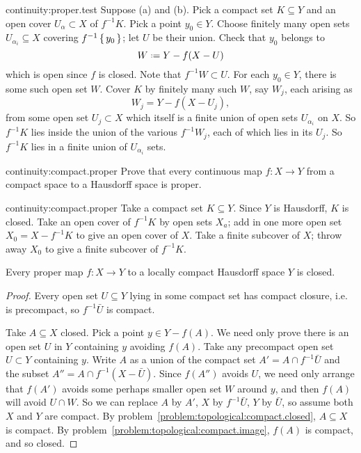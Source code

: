 \begin{answer}{continuity:proper.test}
Suppose (a) and (b).
Pick a compact set \(K\subseteq Y\) and an open cover \(U_{\alpha}\subset X\) of \(f^{-1}K\).
Pick a point \(y_0\in Y\).
Choose finitely many open sets \(U_{\alpha_i}\subseteq X\) covering \(f^{-1}\set{y_0}\); let \(U\) be their union.
Check that \(y_0\) belongs to
\[
W\defeq Y-f(X-U)
\]
which is open since \(f\) is closed.
Note that \(f^{-1}W\subset U\).
For each \(y_0\in Y\), there is some such open set \(W\).
Cover \(K\) by finitely many such \(W\), say \(W_j\), each arising as
\[
W_j=Y-f(X-U_j),
\]
from some open set \(U_j\subset X\) which itself is a finite union of open sets \(U_{\alpha_i}\) on \(X\).
So \(f^{-1}K\) lies inside the union of the various \(f^{-1}W_j\), each of which lies in its \(U_j\).
So \(f^{-1}K\) lies in a finite union of \(U_{\alpha_i}\) sets.
\end{answer}
\begin{problem}{continuity:compact.proper}
Prove that every continuous map \(f\colon X\to Y\) from a compact space to a Hausdorff space is proper.
\end{problem}
\begin{answer}{continuity:compact.proper}
Take a compact set \(K\subseteq Y\).
Since \(Y\) is Hausdorff, \(K\) is closed.
Take an open cover of \(f^{-1}K\) by open sets \(X_a\); add in one more open set \(X_0=X-f^{-1}K\) to give an open cover of \(X\).
Take a finite subcover of \(X\); throw away \(X_0\) to give a finite subcover of \(f^{-1}K\).
\end{answer}
\begin{lemma}\label{lemma:proper.closed}
Every proper map \(f\colon X\to Y\) to a locally compact Hausdorff space \(Y\) is closed.
\end{lemma}
\begin{proof}
Every open set \(U\subseteq Y\) lying in some compact set has compact closure, i.e. is precompact, so \(f^{-1}\bar{U}\) is compact.

Take \(A\subseteq X\) closed.
Pick a point \(y \in Y-f(A)\).
We need only prove there is an open set \(U\) in \(Y\) containing \(y\) avoiding \(f(A)\).
Take any precompact open set \(U\subset Y\) containing \(y\).
Write \(A\) as a union of the compact set \(A'=A\cap f^{-1}\bar{U}\) and the subset \(A''=A\cap f^{-1}(X-\bar{U})\).
Since \(f(A'')\) avoids \(U\), we need only arrange that \(f(A')\) avoids some perhaps smaller open set \(W\) around \(y\), and then \(f(A)\) will avoid \(U\cap W\).
So we can replace \(A\) by \(A'\), \(X\) by \(f^{-1}\bar{U}\), \(Y\) by \(\bar{U}\), so assume both \(X\) and \(Y\) are compact.
By problem~\vref{problem:topological:compact.closed}, \(A\subseteq X\) is compact.
By problem~\vref{problem:topological:compact.image}, \(f(A)\) is compact, and so closed.
\end{proof}

